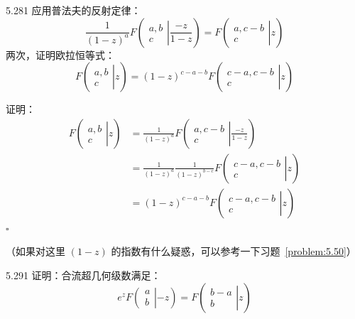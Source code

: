 \begin{problem}{5.28}{1}
  应用普法夫的反射定律：
  \[
    \frac{1}{(1-z)^a} F
    \left( \left.
      \begin{array}{cccc}
        a, b \\
        c
    \end{array} \right|{\frac{-z}{1-z}} \right)
    =
    F
    \left( \left.
      \begin{array}{cccc}
        a, c-b \\
        c
    \end{array} \right|{z} \right)
  \]
  两次，证明欧拉恒等式：
  \[
    F
    \left( \left.
      \begin{array}{cccc}
        a, b \\
        c
    \end{array} \right|{z} \right)
    =
    (1-z)^{c-a-b} F
    \left( \left.
      \begin{array}{cccc}
        c-a, c-b \\
        c
    \end{array} \right|{z} \right)
  \]
\end{problem}

证明：
\begin{align*}
  F
  \left( \left.
    \begin{array}{cccc}
      a, b \\
      c
  \end{array} \right|{z} \right) &= \frac{1}{(1-z)^a} F
  \left( \left.
    \begin{array}{cccc}
      a, c-b \\
      c
  \end{array} \right|{\frac{-z}{1-z}} \right) \\
  &= \frac{1}{(1-z)^a} \frac{1}{(1-z)^{b-c}} F
  \left( \left.
    \begin{array}{cccc}
      c-a, c-b \\
      c
  \end{array} \right|{z} \right) \\
  &= (1-z)^{c-a-b} F
  \left( \left.
    \begin{array}{cccc}
      c-a, c-b \\
      c
  \end{array} \right|{z} \right)
\end{align*}
\hfill \( \square \)

（如果对这里 \( (1-z) \) 的指数有什么疑惑，可以参考一下习题~\ref{problem:5.50}）

\begin{problem}{5.29}{1}
  证明：合流超几何级数满足：
  \[
    e^z F
    \left( \left.
      \begin{array}{cccc}
        a \\
        b
    \end{array} \right|{-z} \right)
    =
    F
    \left( \left.
      \begin{array}{cccc}
        b-a \\
        b
    \end{array} \right|{z} \right)
  \]
\end{problem}

